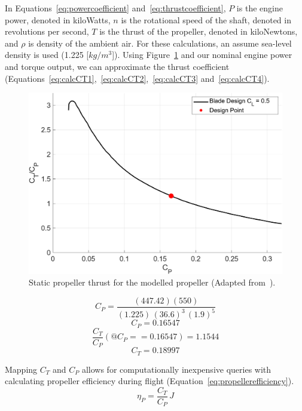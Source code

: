 In Equations~\ref{eq:powercoefficient} and~\ref{eq:thrustcoefficient}, \(P\) is the engine power, denoted in kiloWatts, \(n\) is the rotational speed of the shaft, denoted in revolutions per second, \(T\) is the thrust of the propeller, denoted in kiloNewtons, and \( \rho \) is density of the ambient air. For these calculations, an assume sea-level density is used (1.225 [\(kg/m^3\)]). Using Figure~\ref{fig:staticpropthrust} and our nominal engine power and torque output, we can approximate the thrust coefficient (Equations~\ref{eq:calcCT1},~\ref{eq:calcCT2},~\ref{eq:calcCT3} and~\ref{eq:calcCT4}).

\begin{figure}[!ht]\label{fig:staticpropthrust}
    \centering
    \includegraphics[width=0.85\linewidth]{Figures/StaticThrust.png}
    \caption{Static propeller thrust for the modelled propeller (Adapted from~\cite{GeneralizedMethodPropeller1963}).}
\end{figure}

\begin{equation}\label{eq:calcCT1}
    C_P = \frac{(447.42)(550)}{{(1.225)} \, {(36.6)}^3 \, {(1.9)}^5}
\end{equation}
\begin{equation}\label{eq:calcCT2}
    C_P = 0.16547
\end{equation}
\begin{equation}\label{eq:calcCT3}
    \frac{C_T}{C_P}(@C_P == 0.16547) = 1.1544
\end{equation}
\begin{equation}\label{eq:calcCT4}
    C_T = 0.18997
\end{equation}


Mapping \(C_T\) and \(C_P\) allows for computationally inexpensive queries with calculating propeller efficiency during flight (Equation~\ref{eq:propellerefficiency}).
\begin{equation}\label{eq:propellerefficiency}
    \eta_P = \frac{C_T}{C_P} \, J
\end{equation}

